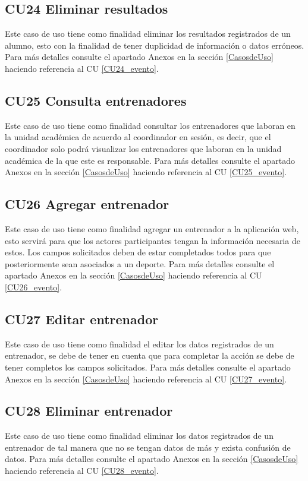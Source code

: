 		\subsection{CU24 Eliminar resultados}
		\noindent Este caso de uso tiene como finalidad eliminar los resultados registrados de un alumno, esto con la finalidad de tener duplicidad de información o datos erróneos. Para más detalles consulte el apartado Anexos en la sección \ref{CasosdeUso} haciendo referencia al CU \ref{CU24_evento}. \\
		
		\subsection{CU25 Consulta entrenadores}
		\noindent Este caso de uso tiene como finalidad consultar los entrenadores que laboran en la unidad académica de acuerdo al coordinador en sesión, es decir, que el coordinador solo podrá visualizar los entrenadores que laboran en la unidad académica de la que este es responsable. Para más detalles consulte el apartado Anexos en la sección \ref{CasosdeUso} haciendo referencia al CU \ref{CU25_evento}.\\
		
		\subsection{CU26 Agregar entrenador}
		\noindent Este caso de uso tiene como finalidad agregar un entrenador a la aplicación web, esto servirá para que los actores participantes tengan la información necesaria de estos. Los campos solicitados deben de estar completados todos para que posteriormente sean asociados a un deporte. Para más detalles consulte el apartado Anexos en la sección \ref{CasosdeUso} haciendo referencia al CU \ref{CU26_evento}.\\
		
		\subsection{CU27 Editar entrenador}
		\noindent Este caso de uso tiene como finalidad el editar los datos registrados de un entrenador, se debe de tener en cuenta que para completar la acción se debe de tener completos los campos solicitados. Para más detalles consulte el apartado Anexos en la sección \ref{CasosdeUso} haciendo referencia al CU \ref{CU27_evento}.\\
		
		\subsection{CU28 Eliminar entrenador}
		\noindent Este caso de uso tiene como finalidad eliminar los datos registrados de un entrenador de tal manera que no se tengan datos de más y exista confusión de datos. Para más detalles consulte el apartado Anexos en la sección \ref{CasosdeUso} haciendo referencia al CU \ref{CU28_evento}.\\
		

